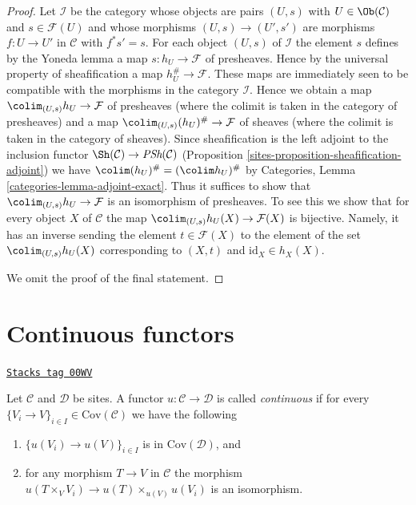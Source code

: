 \begin{proof}

Let $\mathcal{I}$ be the category whose objects are pairs
$(U, s)$ with $U \in \Ob(\mathcal{C})$ and $s \in \mathcal{F}(U)$
and whose morphisms $(U, s) \to (U', s')$ are morphisms $f : U \to U'$
in $\mathcal{C}$ with $f^*s' = s$. For each object $(U, s)$ of $\mathcal{I}$
the element $s$ defines by the Yoneda lemma a map $s : h_U \to \mathcal{F}$
of presheaves. Hence by the universal property of sheafification a map
$h_U^\# \to \mathcal{F}$. These maps are immediately seen to be compatible
with the morphisms in the category $\mathcal{I}$. Hence we obtain
a map $\colim_{(U, s)} h_U \to \mathcal{F}$ of presheaves (where the
colimit is taken in the category of presheaves) and a map
$\colim_{(U, s)} (h_U)^\# \to \mathcal{F}$ of sheaves (where the
colimit is taken in the category of sheaves).
Since sheafification is the left adjoint to the inclusion functor
$\Sh(\mathcal{C}) \to \textit{PSh}(\mathcal{C})$
(Proposition \ref{sites-proposition-sheafification-adjoint}) we have
$\colim (h_U)^\# = (\colim h_U)^\#$ by
Categories, Lemma \ref{categories-lemma-adjoint-exact}.
Thus it suffices to show that $\colim_{(U, s)} h_U \to \mathcal{F}$
is an isomorphism of presheaves. To see this we show that for every object
$X$ of $\mathcal{C}$ the map $\colim_{(U, s)} h_U(X) \to \mathcal{F}(X)$
is bijective. Namely, it has an inverse sending the element
$t \in \mathcal{F}(X)$ to the element of the set $\colim_{(U, s)} h_U(X)$
corresponding to $(X, t)$ and $\text{id}_X \in h_X(X)$.

\medskip\noindent
We omit the proof of the final statement.
\end{proof}

\section{Continuous functors}
\label{sites-section-continuous-functors}
\begin{definition}[Continuous]
\label{sites-definition-continuous}
\href{https://stacks.math.columbia.edu/tag/00WV}{\texttt{Stacks tag 00WV}}

Let $\mathcal{C}$ and $\mathcal{D}$ be sites.
A functor $u : \mathcal{C} \to \mathcal{D}$ is called
{\it continuous} if for every
$\{V_i \to V\}_{i\in I} \in \text{Cov}(\mathcal{C})$
we have the following
\begin{enumerate}
\item $\{u(V_i) \to u(V)\}_{i\in I}$ is in $\text{Cov}(\mathcal{D})$, and
\item for any morphism $T \to V$ in $\mathcal{C}$ the morphism
$u(T \times_V V_i) \to u(T) \times_{u(V)} u(V_i)$ is an isomorphism.
\end{enumerate}
\end{definition}

